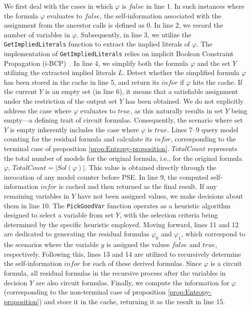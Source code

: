 We first deal with the cases in which $\varphi$ is $\mathit{false}$ in line 1.  
In such instances where the formula $\varphi$ evaluates to $\mathit{false}$, the self-information associated with the assignment from the ancestor calls is defined as 0.
In line 2, we record the number of variables in $\varphi$. 
Subsequently, in line 3, we utilize the \texttt{GetImpliedLiterals} function to extract the implied literals of $\varphi$.
The implementation of \texttt{GetImpliedLiterals} relies on implicit Boolean Constraint Propagation (i-BCP)~\cite{thurley2006sharpsat}. 
In line 4, we simplify both the formula $\varphi$ and the set $Y$ utilizing the extracted implied literals $L$.
Detect whether the simplified formula $\varphi$ has been stored  in the cache in line 5, and return its $\mathit{infor}$ if $\varphi$ hits the cache.
If the current $Y$ is an empty set (in line 6), it means that a satisfiable assignment under the restriction of the output set $Y$ has been obtained. 
We do not explicitly address the case where $\varphi$ evaluates to $\mathit{true}$, as this naturally results in set $Y$ being empty—a defining trait of circuit formulas.
Consequently, the scenario where set $Y$ is empty inherently includes the case where $\varphi$ is $\mathit{true}$.
Lines 7--9 query model counting for the residual formula and calculate its $\mathit{infor}$, corresponding to the terminal case of proposition \ref{prop:Entropy-proposition}.
$TotalCount$ represents the total number of models for the original formula, i.e., for the original formula $\varphi$, $TotalCount= |\mathit{Sol}(\varphi)|$. 
This value is obtained directly through the invocation of any model counter before PSE.
In line 9, the computed self-information $\mathit{infor}$ is cached and then returned as the final result.
If any remaining variables in $Y$ have not been assigned values, we make decisions about them in line 10.
The \texttt{PickGoodVar} function operates as a heuristic algorithm designed to select a variable from set $Y$, with the selection criteria being determined by the specific heuristic employed.
Moving forward, lines 11 and 12 are dedicated to generating the residual formulas $\varphi_0$ and $\varphi_1$, which correspond to the scenarios where the variable $y$ is assigned the values $\mathit{false}$ and $\mathit{true}$, respectively. 
Following this, lines 13 and 14 are utilized to recursively determine the self-information $\mathit{infor}$ for each of these derived formulas.
Since $\varphi$ is a circuit formula, all residual formulas in the recursive process after the variables in decision $Y$ are also circuit formulas.
Finally, we compute the information for $\varphi$ (corresponding to the non-terminal case of proposition \ref{prop:Entropy-proposition}) and store it in the cache, returning it as the result in line 15.


